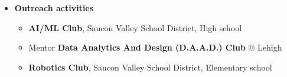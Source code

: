 \documentclass[11pt]{article}
\newcommand{\0}{ {\bf 0}}
\begin{document}
\begin{itemize}[noitemsep,topsep=0pt]
\begin{itemize}  [noitemsep,topsep=0pt]
\item Establish and chair Undergraduate and Masters Research Symposium (2017,2018,2019)

\end{itemize}

\item {\bf\color{color1}Outreach activities} 
\begin{itemize}[noitemsep,topsep=0pt]
\setlength\itemsep{0.1em}
\item 
 {\bf AI/ML Club}, Saucon Valley School District,  High school
 \item Mentor {\bf Data Analytics And Design (D.A.A.D.) Club} @ Lehigh
 \item 
{\bf Robotics Club}, Saucon Valley School District, Elementary school
\end{itemize}

\end{itemize}

 
\end{document}
